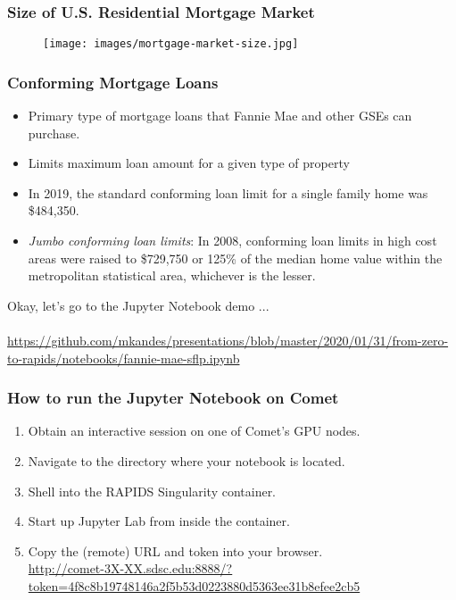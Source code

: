 \documentclass{beamer}
\begin{document}
\begin{frame}
   \frametitle{Size of U.S. Residential Mortgage Market}
   \begin{figure}[htbp]
      \texttt{[image: images/mortgage-market-size.jpg]}
   \end{figure}
\end{frame}

\begin{frame}
   \frametitle{Conforming Mortgage Loans}
   \begin{itemize}\setlength\itemsep{1.0em}
      \item Primary type of mortgage loans that Fannie Mae and other 
         GSEs can purchase.
      \item Limits maximum loan amount for a given type of property
      \item In 2019, the standard conforming loan limit for a single 
         family home was \$484,350. 
      \item \textit{Jumbo conforming loan limits}: In 2008, conforming 
         loan limits in high cost areas were raised to \$729,750 or 
         125\% of the median home value within the metropolitan
         statistical area, whichever is the lesser.
   \end{itemize}
\end{frame}

\begin{frame}
   Okay, let's go to the Jupyter Notebook demo ...
   \\ \ \\
   \url{https://github.com/mkandes/presentations/blob/master/2020/01/31/from-zero-to-rapids/notebooks/fannie-mae-sflp.ipynb}
\end{frame}

\begin{frame}
   \frametitle{How to run the Jupyter Notebook on Comet}
   \begin{enumerate}\setlength\itemsep{0.5em}
      \item Obtain an interactive session on one of Comet's GPU nodes. \\
         
      \item Navigate to the directory where your notebook is located. \\
          
      \item Shell into the RAPIDS Singularity container. \\
         
      \item Start up Jupyter Lab from inside the container. \\
          
      \item Copy the (remote) URL and token into your browser. \\
         \url{http://comet-3X-XX.sdsc.edu:8888/?token=4f8c8b19748146a2f5b53d0223880d5363ee31b8efee2cb5}
   \end{enumerate}
\end{frame}
\end{document}

